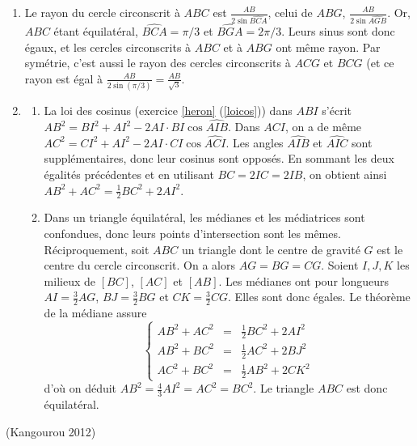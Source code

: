 \documentclass[a4paper,12pt,reqno]{amsart}
\begin{document}
\begin{solution}

  \begin{enumerate}
  \item Le rayon du cercle circonscrit à $ABC$ est $\frac{AB}{2\sin\widehat{BCA}}$, celui de $ABG$, $\frac{AB}{2\sin\widehat{AGB}}$. Or, $ABC$ étant équilatéral, $\widehat{BCA}=\pi/3$ et $\widehat{BGA}=2\pi/3$. Leurs sinus sont donc égaux, et les cercles circonscrits à $ABC$ et à $ABG$ ont même rayon. Par symétrie, c'est aussi le rayon des cercles circonscrits à $ACG$ et $BCG$ (et ce rayon est égal à $\frac{AB}{2\sin(\pi/3)}=\frac{AB}{\sqrt{3}}$.
  \item
  \begin{enumerate}
    \item La loi des cosinus (exercice \ref{heron} (\ref{loicos})) dans $ABI$ s'écrit $AB^2=BI^2+AI^2-2 AI \cdot BI \cos\widehat{AIB}$. Dans $ACI$, on  a de même $AC^2=CI^2+AI^2 - 2 AI \cdot CI \cos \widehat{ACI}$. Les angles $\widehat{AIB}$ et $\widehat{AIC}$ sont supplémentaires, donc leur cosinus sont opposés. En sommant les deux égalités précédentes et en utilisant $BC=2IC=2IB$, on obtient ainsi $AB^2+AC^2=\frac{1}{2}BC^2+2AI^2$.
    \item Dans un triangle équilatéral, les médianes et les médiatrices sont confondues, donc leurs points d'intersection sont les mêmes. Réciproquement, soit $ABC$ un triangle dont le centre de gravité $G$ est le centre du cercle circonscrit. On a alors $AG=BG=CG$. Soient $I,J,K$ les milieux de $[BC]$, $[AC]$ et $[AB]$. Les médianes ont pour longueurs $AI=\frac{3}{2}AG$, $BJ=\frac{3}{2}BG$ et $CK=\frac{3}{2}CG$. Elles sont donc égales. Le théorème de la médiane assure
    \begin{equation*}
      \left\lbrace \begin{array}{rcl} AB^2+AC^2&=&\frac{1}{2}BC^2+2AI^2 \\ AB^2+BC^2&=&\frac{1}{2}AC^2+2BJ^2 \\ AC^2+BC^2&=&\frac{1}{2}AB^2+2CK^2\end{array} \right.
    \end{equation*}
    d'où on déduit $AB^2=\frac{4}{3}AI^2=AC^2=BC^2$. Le triangle $ABC$ est donc équilatéral.
   \end{enumerate}
 \end{enumerate}
\end{solution}


\begin{exo}[.7] (Kangourou 2012)

\end{exo}
\end{document}
